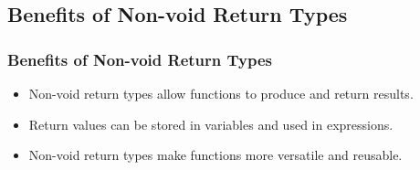\subsection{Benefits of Non-void Return Types}
\begin{frame}
\frametitle{Benefits of Non-void Return Types}
\begin{itemize}
    \item Non-void return types allow functions to produce and return results.
    \item Return values can be stored in variables and used in expressions.
    \item Non-void return types make functions more versatile and reusable.
\end{itemize}
\end{frame}
